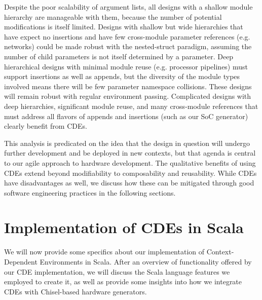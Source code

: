 Despite the poor scalability of argument lists, all designs with a shallow module hierarchy are manageable with them, because the number of potential modifications is itself limited. 
Designs with shallow but wide hierarchies that have expect no insertions and have few cross-module parameter references (e.g. networks) could be made robust with the nested-struct paradigm,
assuming the number of child parameters is not itself determined by a parameter.
Deep hierarchical designs with minimal module reuse (e.g. processor pipelines) must support insertions as well as appends, but the diversity of the module types involved means there will be few parameter namespace collisions. These designs will remain robust with regular environment passing.
Complicated designs with deep hierarchies, significant module reuse, and many cross-module references that must address all flavors of appends and insertions (such as our SoC generator) clearly benefit from CDEs.

This analysis is predicated on the idea that the design in question will undergo further development and be deployed in new contexts,
but that agenda is central to our agile approach to hardware development.
The qualitative benefits of using CDEs extend beyond modifiability to composability and reusability.
While CDEs have disadvantages as well, we discuss how these can be mitigated through good software engineering practices in the following sections.

\section{Implementation of CDEs in Scala}
\label{sec:impl}

We will now provide some specifics about our implementation of Context-Dependent Environments in Scala.
After an overview of functionality offered by our CDE implementation, we will discuss the Scala language features we employed to create it,
as well as provide some insights into how we integrate CDEs with Chisel-based hardware generators.

